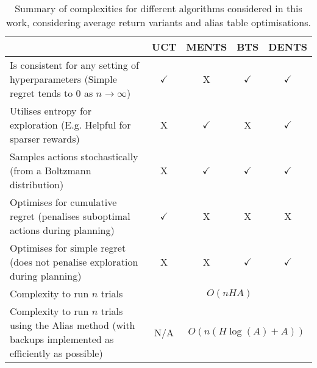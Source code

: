 \documentclass{article}
\theoremstyle{plain}
\begin{document}
\begin{appendices}
	    
       
        \begin{table*}[]
            \centering
            \begin{tabular}{p{8cm}|c|c|c|c}
                						& UCT      		& MENTS          & BTS               & DENTS \\ 
                \hline
                {Is consistent for any setting of hyperparameters	 \newline (Simple regret tends to 0 as $n\rightarrow\infty$)}
                						& $\checkmark$ 	& X 				& $\checkmark$		& $\checkmark$ 	\\
                \hline
                {Utilises entropy for exploration \newline (E.g. Helpful for sparser rewards)}
                						& X				& $\checkmark$	& X					& $\checkmark$	\\
                \hline
                {Samples actions stochastically \newline(from a Boltzmann distribution)}
                						& X 				& $\checkmark$ 	& $\checkmark$ 		& $\checkmark$	\\
                \hline
                {Optimises for cumulative regret  \newline (penalises suboptimal actions during planning)} 
                						& $\checkmark$	& X 				& X					& X 	\\
                \hline
                	{Optimises for simple regret  \newline (does not penalise exploration during planning)}
                						& X 				& X 				& $\checkmark$ 		& $\checkmark$	\\
                \hline
                	{Complexity to run $n$ trials}	
                						& \multicolumn{4}{c}{$O(nHA)$} 							\\
                \hline
                	{Complexity to run $n$ trials using the Alias method  \newline (with backups implemented as efficiently as possible)}	
                						& N/A 		& \multicolumn{3}{c}{$O(n(H\log(A)+A))$} 			\\
            \end{tabular}
            \caption{Summary of complexities for different algorithms considered in this work, considering average return variants and alias table optimisations. \label{table:compare_algs}}
        \end{table*}
		


\end{appendices}
\end{document}
